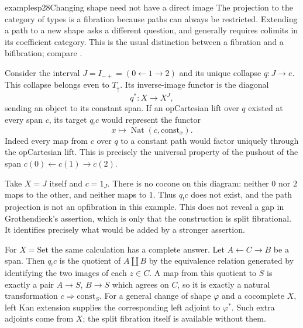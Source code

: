 \begin{dcomment}{examples}{p28}{Changing shape need not have a direct image}
The projection to the category of types is a fibration because paths can always be restricted. Extending a path to a new shape asks a different question, and generally requires colimits in its coefficient category. This is the usual distinction between a fibration and a bifibration; compare \citet[Expos\'e~VI, \S10 and \S11(f)]{GrothendieckSGA1}.

Consider the interval $J=I_{-+}=(0\leftarrow1\to2)$ and its unique collapse $q:J\to e$. This collapse belongs even to $T_{\uparrow}$. Its inverse-image functor is the diagonal
\[
 q^*:X\longrightarrow X^J,
\]
sending an object to its constant span. If an opCartesian lift over $q$ existed at every span $c$, its target $q_!c$ would represent the functor
\[
 x\longmapsto\operatorname{Nat}(c,\mathrm{const}_x).
\]
Indeed every map from $c$ over $q$ to a constant path would factor uniquely through the opCartesian lift. This is precisely the universal property of the pushout of the span $c(0)\leftarrow c(1)\to c(2)$.

Take $X=J$ itself and $c=1_J$. There is no cocone on this diagram: neither $0$ nor $2$ maps to the other, and neither maps to $1$. Thus $q_!c$ does not exist, and the path projection is not an opfibration in this example. This does not reveal a gap in Grothendieck's assertion, which is only that the construction is split fibrational. It identifies precisely what would be added by a stronger assertion.

For $X=\mathrm{Set}$ the same calculation has a complete answer. Let $A\leftarrow C\to B$ be a span. Then $q_!c$ is the quotient of $A\amalg B$ by the equivalence relation generated by identifying the two images of each $z\in C$. A map from this quotient to $S$ is exactly a pair $A\to S$, $B\to S$ which agrees on $C$, so it is exactly a natural transformation $c\Rightarrow\mathrm{const}_S$. For a general change of shape $\varphi$ and a cocomplete $X$, left Kan extension supplies the corresponding left adjoint to $\varphi^*$. Such extra adjoints come from $X$; the split fibration itself is available without them.
\end{dcomment}

